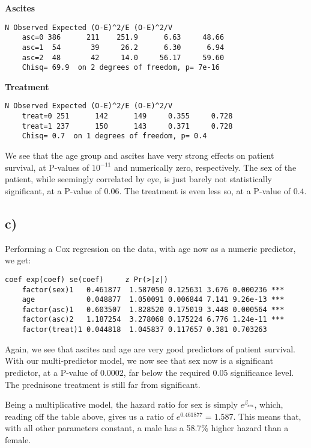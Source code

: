 \documentclass[a4paper, twocolumn]{article}
\renewcommand{\exp}{e^}
\begin{document}
\textbf{Ascites}
\begin{Verbatim}[fontsize=\scriptsize]
            N Observed Expected (O-E)^2/E (O-E)^2/V
    asc=0 386      211    251.9      6.63     48.66
    asc=1  54       39     26.2      6.30      6.94
    asc=2  48       42     14.0     56.17     59.60
    Chisq= 69.9  on 2 degrees of freedom, p= 7e-16 
\end{Verbatim}

\textbf{Treatment}
\begin{Verbatim}[fontsize=\scriptsize]
            N Observed Expected (O-E)^2/E (O-E)^2/V
    treat=0 251      142      149     0.355     0.728
    treat=1 237      150      143     0.371     0.728
    Chisq= 0.7  on 1 degrees of freedom, p= 0.4
\end{Verbatim}

We see that the age group and ascites have very strong effects on patient survival, at P-values of $10^{-11}$ and numerically zero, respectively. The sex of the patient, while seemingly correlated by eye, is just barely not statistically significant, at a P-value of $0.06$. The treatment is even less so, at a P-value of $0.4$.


\subsection*{c)}
Performing a Cox regression on the data, with age now as a numeric predictor, we get:
\begin{Verbatim}[fontsize=\scriptsize]
                    coef exp(coef) se(coef)     z Pr(>|z|)    
    factor(sex)1   0.461877  1.587050 0.125631 3.676 0.000236 ***
    age            0.048877  1.050091 0.006844 7.141 9.26e-13 ***
    factor(asc)1   0.603507  1.828520 0.175019 3.448 0.000564 ***
    factor(asc)2   1.187254  3.278068 0.175224 6.776 1.24e-11 ***
    factor(treat)1 0.044818  1.045837 0.117657 0.381 0.703263    
\end{Verbatim}

Again, we see that ascites and age are very good predictors of patient survival. With our multi-predictor model, we now see that sex now is a significant predictor, at a P-value of $0.0002$, far below the required $0.05$ significance level. The prednisone treatment is still far from significant.

Being a multiplicative model, the hazard ratio for sex is simply $\exp{\beta_\mathrm{sex}}$, which, reading off the table above, gives us a ratio of $\exp{0.461877} = 1.587$. This means that, with all other parameters constant, a male has a 58.7\% higher hazard than a female.
\end{document}
